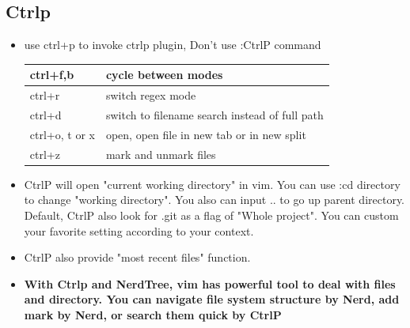 \documentclass[a4paper,12pt,twoside]{book}
\begin{document}
\subsection{Ctrlp}
\begin{itemize}
\item use ctrl+p to invoke ctrlp plugin, Don't use :CtrlP command  \\ 
\begin{tabular}{|p{}|p{}|}
\hline 
ctrl+f,b  & cycle between modes \\ 
\hline 
ctrl+r & switch regex mode  \\ 
\hline 
ctrl+d & switch to filename search instead of full path \\ 
\hline 
ctrl+o, t or x & open, open file in new tab or in new split \\ 
\hline 
ctrl+z  & mark and unmark files \\ 
\hline 
\end{tabular} 
\item CtrlP will open "current working directory" in vim. You can use :cd directory to change "working directory". You also can input .. to go up parent directory. Default, CtrlP also look for .git as a flag of "Whole project". You can custom your favorite setting according to your context.

\item CtrlP also provide "most recent files" function.

\item \textbf{With Ctrlp and NerdTree, vim has powerful tool to deal with files and directory. You can navigate file system structure by Nerd, add mark by Nerd, or search them quick by CtrlP}
\end{itemize}
\end{document}
